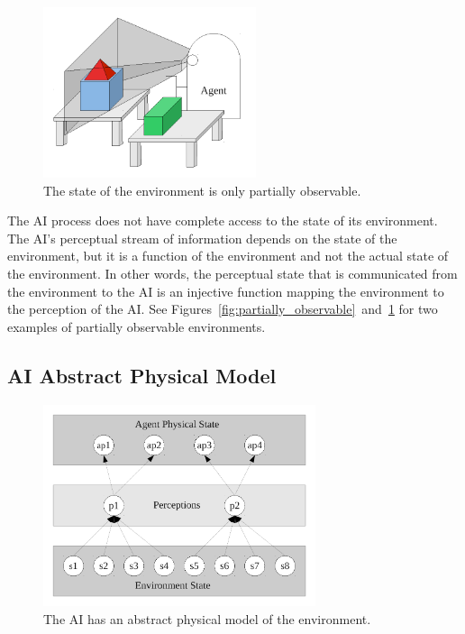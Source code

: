 \begin{figure}[bth]
  \center
  \includegraphics[height=5cm]{gfx/partial_frame_perception}
  \caption[The state of the environment is only partially
    observable]{The state of the environment is only partially
    observable.}
  \label{fig:partial_frame_perception}
\end{figure}

The AI process does not have complete access to the state of its
environment.  The AI's perceptual stream of information depends on
the state of the environment, but it is a function of the environment
and not the actual state of the environment.  In other words, the
perceptual state that is communicated from the environment to the
AI is an injective function mapping the environment to the
perception of the AI.  See
Figures~\ref{fig:partially_observable}~and~\ref{fig:partial_frame_perception}
for two examples of partially observable environments.


\subsection{AI Abstract Physical Model}

\begin{figure}[bth]
  \center
  \includegraphics[width=8cm]{gfx/environment_perception_physical}
  \caption[The AI has an abstract physical model of the
    environment]{The AI has an abstract physical model of the
    environment.}
  \label{fig:environment_perception_physical}
\end{figure}


